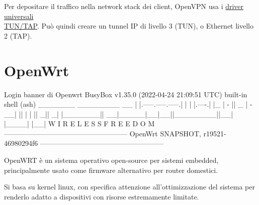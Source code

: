
Per depositare il traffico nella network stack dei client, OpenVPN usa i \href{https://docs.kernel.org/networking/tuntap.html}{driver universali \\TUN/TAP}. Può quindi creare un tunnel IP di livello 3 (TUN), o Ethernet livello 2 (TAP).


\section{OpenWrt}

\begin{bashcode}{Login banner di Openwrt}{}
BusyBox v1.35.0 (2022-04-24 21:09:51 UTC) built-in shell (ash)
_______                     ________        __
|       |.-----.-----.-----.|  |  |  |.----.|  |_
|   -   ||  _  |  -__|     ||  |  |  ||   _||   _|
|_______||   __|_____|__|__||________||__|  |____|
|__| W I R E L E S S   F R E E D O M
-----------------------------------------------------
OpenWrt SNAPSHOT, r19521-46980294f6
-----------------------------------------------------
\end{bashcode}

OpenWRT è un sistema operativo open-source per sistemi embedded, principalmente usato come firmware alternativo per router domestici.

Si basa su kernel linux, con specifica attenzione all'ottimizzazione del sistema per renderlo adatto a dispositivi con risorse estremamente limitate.

